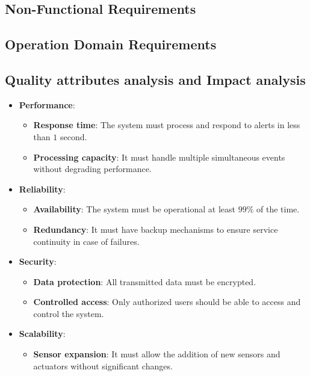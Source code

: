 \subsection{Non-Functional Requirements}

\subsection{Operation Domain Requirements}



\clearpage
\subsection{Quality attributes analysis and Impact analysis}

\begin{itemize}
    \item \textbf{Performance}:
        \begin{itemize}
            \item \textbf{Response time}: The system must process and respond to alerts in less than $1$ second.
            \item \textbf{Processing capacity}: It must handle multiple simultaneous events without degrading performance.
        \end{itemize}
    \item \textbf{Reliability}:
        \begin{itemize}
            \item \textbf{Availability}: The system must be operational at least $99 \%$ of the time.
            \item \textbf{Redundancy}: It must have backup mechanisms to ensure service continuity in case of failures.
        \end{itemize}
    \item \textbf{Security}:
        \begin{itemize}
            \item \textbf{Data protection}: All transmitted data must be encrypted.
            \item \textbf{Controlled access}: Only authorized users should be able to access and control the system.
        \end{itemize}
    \item \textbf{Scalability}:
        \begin{itemize}
            \item \textbf{Sensor expansion}: It must allow the addition of new sensors and actuators without significant changes.

\end{itemize}
\end{itemize}
